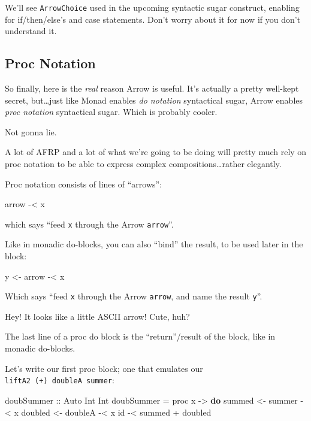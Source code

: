 \documentclass[]{article}
\newenvironment{Shaded}{}{}
\newcommand{\DataTypeTok}[1]{\textcolor[rgb]{0.56,0.13,0.00}{#1}}
\newcommand{\FunctionTok}[1]{\textcolor[rgb]{0.02,0.16,0.49}{#1}}
\newcommand{\KeywordTok}[1]{\textcolor[rgb]{0.00,0.44,0.13}{\textbf{#1}}}
\newcommand{\NormalTok}[1]{#1}
\newcommand{\OperatorTok}[1]{\textcolor[rgb]{0.40,0.40,0.40}{#1}}
\newcommand{\OtherTok}[1]{\textcolor[rgb]{0.00,0.44,0.13}{#1}}
\begin{document}
We'll see \texttt{ArrowChoice} used in the upcoming syntactic sugar construct,
enabling for if/then/else's and case statements. Don't worry about it for now if
you don't understand it.

\subsection{Proc Notation}\label{proc-notation}

So finally, here is the \emph{real} reason Arrow is useful. It's actually a
pretty well-kept secret, but\ldots just like Monad enables \emph{do notation}
syntactical sugar, Arrow enables \emph{proc notation} syntactical sugar. Which
is probably cooler.

Not gonna lie.

A lot of AFRP and a lot of what we're going to be doing will pretty much rely on
proc notation to be able to express complex compositions\ldots rather elegantly.

Proc notation consists of lines of ``arrows'':

\begin{Shaded}
\begin{Highlighting}[]
\NormalTok{arrow }\OperatorTok{{-}\textless{}}\NormalTok{ x}
\end{Highlighting}
\end{Shaded}

which says ``feed \texttt{x} through the Arrow \texttt{arrow}''.

Like in monadic do-blocks, you can also ``bind'' the result, to be used later in
the block:

\begin{Shaded}
\begin{Highlighting}[]
\NormalTok{y }\OtherTok{\textless{}{-}}\NormalTok{ arrow }\OperatorTok{{-}\textless{}}\NormalTok{ x}
\end{Highlighting}
\end{Shaded}

Which says ``feed \texttt{x} through the Arrow \texttt{arrow}, and name the
result \texttt{y}''.

Hey! It looks like a little ASCII arrow! Cute, huh?

The last line of a proc do block is the ``return''/result of the block, like in
monadic do-blocks.

Let's write our first proc block; one that emulates our
\texttt{liftA2\ (+)\ doubleA\ summer}:

\begin{Shaded}
\begin{Highlighting}[]
\OtherTok{doubSummer ::} \DataTypeTok{Auto} \DataTypeTok{Int} \DataTypeTok{Int}
\NormalTok{doubSummer }\OtherTok{=}\NormalTok{ proc x }\OtherTok{{-}\textgreater{}} \KeywordTok{do}
\NormalTok{    summed  }\OtherTok{\textless{}{-}}\NormalTok{ summer  }\OperatorTok{{-}\textless{}}\NormalTok{ x}
\NormalTok{    doubled }\OtherTok{\textless{}{-}}\NormalTok{ doubleA }\OperatorTok{{-}\textless{}}\NormalTok{ x}
    \FunctionTok{id} \OperatorTok{{-}\textless{}}\NormalTok{ summed }\OperatorTok{+}\NormalTok{ doubled}
\end{Highlighting}
\end{Shaded}
\end{document}

